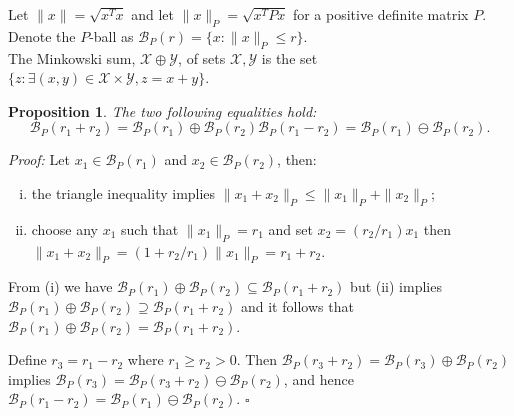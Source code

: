 \documentclass[11pt, oneside]{article}
\newcounter{thmcount}
\newtheorem{prop}[thmcount]{Proposition}
\def\B{\mathscr{B}}
\begin{document}
Let $\|x\|=\sqrt{x^T x}$ and let $\|x\|_P=\sqrt{x^T P x}$ for a positive definite matrix $P$. \\
Denote the $P$-ball as $\mathscr B_P(r) = \{x: \|x\|_P \leq r\}$. \\
The Minkowski sum, $\mathcal{X}\oplus\mathcal{Y}$, of sets $\mathcal{X},\mathcal{Y}$ is the set $\{z: \exists (x,y)\in\mathcal{X}\times\mathcal{Y}, z = x+y\}$.

\begin{prop}
The two following equalities hold:
\begin{subequations}\label{eq:balladd}
\begin{equation}
  \mathscr B_P(r_1+r_2) = \mathscr B_P(r_1)\oplus\mathscr B_P(r_2)
\end{equation}
\begin{equation}
  \mathscr B_P(r_1-r_2) = \mathscr B_P(r_1)\ominus\mathscr B_P(r_2) .
\end{equation}
\end{subequations}
\end{prop}

\textit{Proof:}\hspace{1ex}
Let $x_1\in\B_P(r_1)$ and $x_2\in\B_P(r_2)$, then:
\begin{enumerate}[(i).]
\item
the triangle inequality implies $\|x_1+x_2\|_P\leq \|x_1\|_P+\|x_2\|_P$;
\item
choose any $x_1$ such that $\|x_1\|_P = r_1$ and set $x_2 = (r_2/r_1)x_1$ then $\|x_1+x_2\|_P = (1+r_2/r_1)\|x_1\|_P = r_1 + r_2$.
\end{enumerate}
From (i) we have $\B_P(r_1)\oplus\B_P(r_2) \subseteq \B_P(r_1+r_2)$ but (ii) implies $\B_P(r_1)\oplus\B_P(r_2) \supseteq \B_P(r_1+r_2)$ and it follows that $\B_P(r_1) \oplus \B_P(r_2) = \B_P(r_1 + r_2)$.

Define $r_3 = r_1-r_2$ where $r_1\geq r_2 > 0$.
Then $\B_P(r_3 + r_2) = \B_P(r_3) \oplus \B_P(r_2)$ implies $\B_P(r_3) = \B_P(r_3 + r_2) \ominus \B_P(r_2)$, and hence $\B_P(r_1-r_2) = \B_P(r_1) \ominus \B_P(r_2)$.
\mbox{}\hfill$\square$
\end{document}
